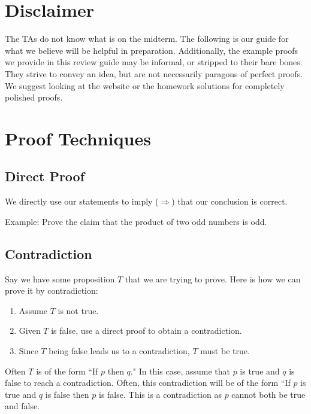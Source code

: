 \documentclass[12pt,letterpaper]{article}
\begin{document}
\section{Disclaimer}

The TAs do not know what is on the midterm. The following is our guide for what we believe will be helpful in preparation. Additionally, the example proofs we provide in this review guide may be informal, or stripped to their bare bones. They strive to convey an idea, but are not necessarily paragons of perfect proofs. We suggest looking at the website or the homework solutions for completely polished proofs.

\section{Proof Techniques}

    \subsection{Direct Proof}
    
    We directly use our statements to imply ($\Rightarrow$) that our conclusion is correct.
    
    Example: Prove the claim that the product of two odd numbers is odd.
    \begin{mdframed}\vspace{2 cm}\end{mdframed}
    
    \subsection{Contradiction}
    
    Say we have some proposition $T$ that we are trying to prove. Here is how we can  prove it by contradiction:
      \begin{enumerate}
        \item Assume $T$ is not true.
        \item Given $T$ is false, use a direct proof to obtain a contradiction.
        \item Since $T$ being false leads us to a contradiction, $T$ must be true.
      \end{enumerate}
      
    Often $T$ is of the form ``If $p$ then $q$." In this case, assume that $p$ is true and $q$ is false to reach a contradiction. Often, this contradiction will be of the form ``If $p$ is true and $q$ is false then $p$ is false. This is a contradiction as $p$ cannot both be true and false. 
    
\end{document}
